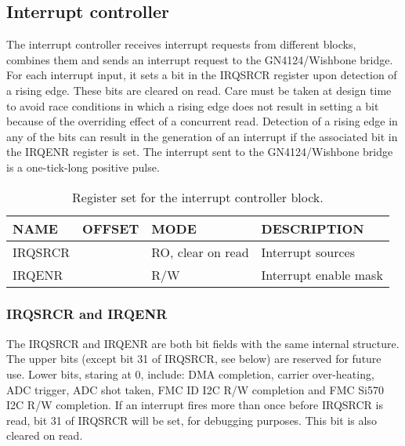 \documentclass{article}
\begin{document}
\subsection{Interrupt controller}
The interrupt controller receives interrupt requests from different blocks, combines them and sends an interrupt request to the GN4124/Wishbone bridge. For each interrupt input, it sets a bit in the IRQSRCR register upon detection of a rising edge. These bits are cleared on read. Care must be taken at design time to avoid race conditions in which a rising edge does not result in setting a bit because of the overriding effect of a concurrent read. Detection of a rising edge in any of the bits can result in the generation of an interrupt if the associated bit in the IRQENR register is set. The interrupt sent to the GN4124/Wishbone bridge is a one-tick-long positive pulse.

\begin{table}[htbp]
  \centering
  \begin{tabularx}{\textwidth}{|l|r|l|X|}
    \hline
    \textbf{NAME} & \textbf{OFFSET} & \textbf{MODE} & \textbf{DESCRIPTION} \\
    \hline
    \hline
    IRQSRCR & & RO, clear on read & Interrupt sources\\
    \hline
    IRQENR & & R/W & Interrupt enable mask\\
    \hline
  \end{tabularx}
  \caption{Register set for the interrupt controller block.}
  \label{tab:irq_control}
\end{table}

\subsubsection{IRQSRCR and IRQENR}
The IRQSRCR and IRQENR are both bit fields with the same internal structure. The upper bits (except bit 31 of IRQSRCR, see below) are reserved for future use. Lower bits, staring at 0, include: DMA completion, carrier over-heating, ADC trigger, ADC shot taken, FMC ID I2C R/W completion and FMC Si570 I2C R/W completion. If an interrupt fires more than once before IRQSRCR is read, bit 31 of IRQSRCR will be set, for debugging purposes. This bit is also cleared on read.   
\end{document}
